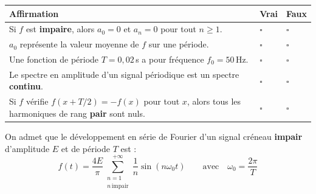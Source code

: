 \documentclass[a4paper,11pt]{article}
\begin{document}
\renewcommand{\arraystretch}{2.2}
\begin{tabular}{|p{11.5cm}|>{\centering\arraybackslash}p{1.5cm}|>{\centering\arraybackslash}p{1.5cm}|}
\hline
\textbf{Affirmation} & \textbf{Vrai} & \textbf{Faux} \\
\hline
Si $f$ est \textbf{impaire}, alors $a_0 = 0$ et $a_n = 0$ pour tout $n \geq 1$. & $\square$ & $\square$ \\
\hline
$a_0$ représente la valeur moyenne de $f$ sur une période. & $\square$ & $\square$ \\
\hline
Une fonction de période $T = 0{,}02$\,s a pour fréquence $f_0 = 50$\,Hz. & $\square$ & $\square$ \\
\hline
Le spectre en amplitude d'un signal périodique est un spectre \textbf{continu}. & $\square$ & $\square$ \\
\hline
Si $f$ vérifie $f(x+T/2) = -f(x)$ pour tout $x$, alors tous les harmoniques de rang \textbf{pair} sont nuls. & $\square$ & $\square$ \\
\hline
\end{tabular}

\vspace{0.3cm}

\begin{tcolorbox}[exobox={Exercice 4 — Spectre et Parseval}]
On admet que le développement en série de Fourier d'un signal créneau \textbf{impair} d'amplitude $E$ et de période $T$ est :
\[
  f(t) = \frac{4E}{\pi}\sum_{\substack{n=1\\n\,\text{impair}}}^{+\infty} \frac{1}{n}\sin(n\omega_0 t)
  \qquad\text{avec}\quad \omega_0 = \frac{2\pi}{T}
\]
\end{tcolorbox}
\end{document}
